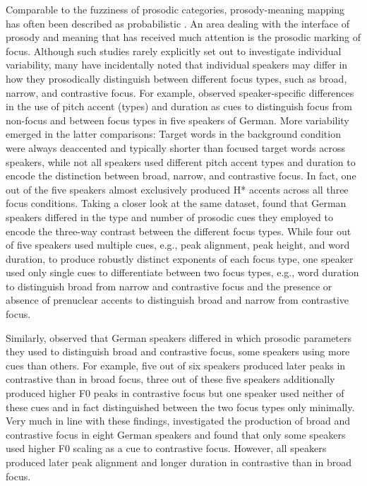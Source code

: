 Comparable to the fuzziness of prosodic categories, prosody-meaning mapping has often been described as probabilistic \citep[e.g.,][]{calhounCentralityMetricalStructure2010}. An area dealing with the interface of prosody and meaning that has received much attention is the prosodic marking of focus. Although such studies rarely explicitly set out to investigate individual variability, many have incidentally noted that individual speakers may differ in how they prosodically distinguish between different focus types, such as broad, narrow, and contrastive focus. For example, \citet{muckeEffectFocusMarking2014} observed speaker-specific differences in the use of pitch accent (types) and duration as cues to distinguish focus from non-focus and between focus types in five speakers of German. More variability emerged in the latter comparisons: Target words in the background condition were always deaccented and typically shorter than focused target words across speakers, while not all speakers used different pitch accent types and duration to encode the distinction between broad, narrow, and contrastive focus. In fact, one out of the five speakers almost exclusively produced H* accents across all three focus conditions. Taking a closer look at the same dataset, \citet{cangemiListenerSpecificPerceptionSpeakerSpecific2015} found that German speakers differed in the type and number of prosodic cues they employed to encode the three-way contrast between the different focus types. While four out of five speakers used multiple cues, e.g., peak alignment, peak height, and word duration, to produce robustly distinct exponents of each focus type, one speaker used only single cues to differentiate between two focus types, e.g., word duration to distinguish broad from narrow and contrastive focus and the presence or absence of prenuclear accents to distinguish broad and narrow from contrastive focus. 

Similarly, \citet{baumannTonalArticulatoryMarking2007} observed that German speakers differed in which prosodic parameters they used to distinguish broad and contrastive focus, some speakers using more cues than others. For example, five out of six speakers produced later peaks in contrastive than in broad focus, three out of these five speakers additionally produced higher F0 peaks in contrastive focus but one speaker used neither of these cues and in fact distinguished between the two focus types only minimally. Very much in line with these findings, \citet{kuglerProductionPerceptionContrast2015} investigated the production of broad and contrastive focus in eight German speakers and found that only some speakers used higher F0 scaling as a cue to contrastive focus. However, all speakers produced later peak alignment and longer duration in contrastive than in broad focus.

